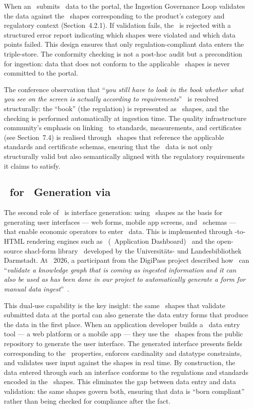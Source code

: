 When an \REO\ submits \DPP\ data to the portal, the Ingestion Governance Loop
validates the data against the \SHACL\ shapes corresponding to the product's
category and regulatory context (Section~4.2.1). If validation fails, the \DPP\
is rejected with a structured error report indicating which shapes were violated
and which data points failed. This design ensures that only regulation-compliant
data enters the triple-store. The conformity checking is not a post-hoc audit
but a precondition for ingestion: data that does not conform to the applicable
\SHACL\ shapes is never committed to the portal.

The conference observation that ``\textit{you still have to look in the book
whether what you see on the screen is actually according to
requirements}''~\cite{dpp4eu2026_day1} is resolved structurally: the ``book''
(the regulation) is represented as \SHACL\ shapes, and the checking is performed
automatically at ingestion time. The quality infrastructure community's emphasis
on linking \DPPs\ to standards, measurements, and certificates (see Section~7.4)
is realised through \SHACL\ shapes that reference the applicable standards and
certificate schemas, ensuring that the \DPP\ data is not only structurally valid
but also semantically aligned with the regulatory requirements it claims to
satisfy.

\subsection{\SHACL\ for \GUI\ Generation via \DASH}

The second role of \SHACL\ is interface generation: using \SHACL\ shapes as the
basis for generating user interfaces --- web forms, mobile app screens, and
\API\ schemas --- that enable economic operators to enter \DPP\ data. This is
implemented through \SHACL-to-HTML rendering engines such as \DASH\ (\SHACL\
Application Dashboard)~\cite{dash_shacl} and the open-source shacl-form
library~\cite{shacl_form_lib} developed by the Universitäts- und
Landesbibliothek Darmstadt. At \DPPforEU~2026, a participant from the DigiPass
project described how \SHACL\ can ``\textit{validate a knowledge graph that is
coming as ingested information and it can also be used as has been done in our
project to automatically generate a form for manual data
ingest}''~\cite{dpp4eu2026_day2}.

This dual-use capability is the key insight: the same \SHACL\ shapes that
validate submitted data at the portal can also generate the data entry forms
that produce the data in the first place. When an application developer builds a
\DPP\ data entry tool --- a web platform or a mobile app --- they use the
\SHACL\ shapes from the public repository to generate the user interface. The
generated interface presents fields corresponding to the \SHACL\ properties,
enforces cardinality and datatype constraints, and validates user input against
the shapes in real time. By construction, the data entered through such an
interface conforms to the regulations and standards encoded in the \SHACL\
shapes. This eliminates the gap between data entry and data validation: the same
shapes govern both, ensuring that data is ``born compliant'' rather than being
checked for compliance after the fact.

